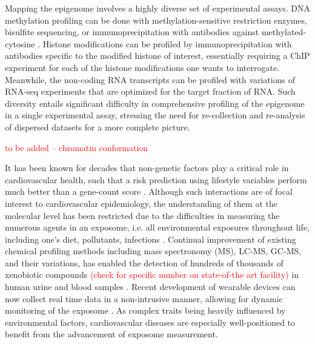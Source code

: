 \documentclass[letter]{bioinfo}
\newcommand{\comment}[1]{\textcolor{red}{#1}}
\begin{document}
	Mapping the epigenome involves a highly diverse set of experimental assays. DNA methylation profiling can be done with methylation-sensitive restriction enzymes, bisulfite sequencing, or immunoprecipitation with antibodies against  methylated-cytosine \citep{Bibikova:2010:Genomewide}. Histone modifications can be profiled by immunoprecipitation with antibodies specific to the modified histone of interest, essentially requiring a ChIP experiment for each of the histone modifications one wants to interrogate. Meanwhile, the non-coding RNA transcripts can be profiled with variations of RNA-seq experiments that are optimized for the target fraction of RNA. Such diversity entails significant difficulty in comprehensive profiling of the epigenome in a single experimental assay, stressing the need for re-collection and re-analysis of dispersed datasets for a more complete picture.
	
	
	
	
	\comment{to be added -- chromatin conformation \citep{Rosa-Garrido:2017:HighResolution}}
	
	
	It has been known for decades that non-genetic factors play a critical role in cardiovascular health, such that a risk prediction using lifestyle variables perform much better than a gene-count score \citep{Joyner:2011:Ten}. Although such interactions are of focal interest to cardiovascular epidemiology,  the understanding of them at the molecular level has been restricted due to the difficulties in measuring the numerous agents in an exposome, i.e. all environmental exposures throughout life, including one's diet, pollutants, infections \citep{Wild:2005:Complementing}. Continual improvement of existing chemical profiling methods including mass spectronomy (MS), LC-MS, GC-MS, and their variations, has enabled the detection of hundreds of thousands of xenobiotic compounds \comment{(check for specific number on state-of-the art facility)} in human urine and blood samples \citep{Warth:2017:ExposomeScale}.
	Recent development of wearable devices can now collect real time data in a non-intrusive manner, allowing for dynamic monitoring of the exposome \citep{Jiang:2018:Dynamic}. As complex traits being heavily influenced by environmental factors, cardiovascular diseases are especially well-positioned to benefit from the advancement of exposome measurement.
	
\end{document}
